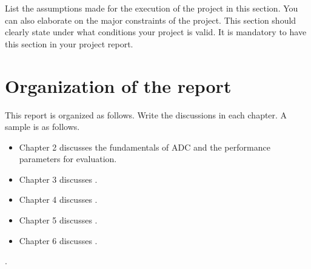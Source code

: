 List the assumptions made for the execution of the project in this section. You can also elaborate on the major constraints of the project. This section should clearly state under what conditions your project is valid. It is mandatory to have this section in your project report.

\section[Organization of the report]{\textbf{Organization of the report}}

This report is organized as follows. Write the discussions in each chapter. A sample is as follows.
\begin{itemize}
\item Chapter 2 discusses the fundamentals of ADC and the performance parameters for evaluation.
\item Chapter 3 discusses .
\item Chapter 4 discusses .
\item Chapter 5 discusses .
\item Chapter 6 discusses .
\end{itemize}

.